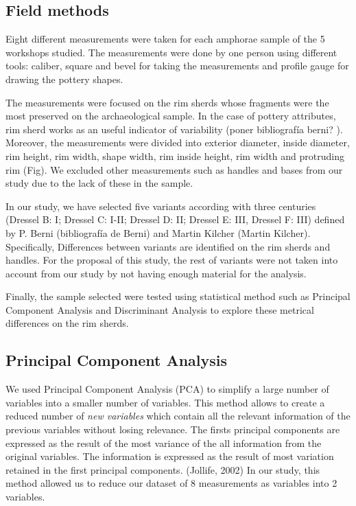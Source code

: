 \documentclass[review]{elsarticle}
\begin{document}


\subsection{Field methods}


Eight different measurements were taken for each amphorae sample of the 5 workshops studied. The measurements were done by one person using different tools: caliber, square and bevel for taking the measurements and profile gauge for drawing the pottery shapes. 

The measurements were focused on the rim sherds whose fragments were the most preserved on the archaeological sample. In the case of pottery attributes, rim sherd works as an useful indicator of variability (poner bibliografía berni? ). Moreover, the measurements were divided into exterior diameter, inside diameter, rim height, rim width, shape width, rim inside height, rim width and protruding rim (Fig). We excluded other measurements such as handles and bases from our study due to the lack of these in the sample.    

In our study, we have selected five variants according with three centuries (Dressel B: I; Dressel C: I-II; Dressel D: II; Dressel E: III, Dressel F: III) defined by P. Berni (bibliografía de Berni) and Martin Kilcher (Martin Kilcher). Specifically, Differences between variants are identified on the rim sherds and handles. For the proposal of this study, the rest of variants were not taken into account from our study by not having enough material for the analysis. 

Finally, the sample selected were tested using statistical method such as Principal Component Analysis and Discriminant Analysis to explore these metrical differences on the rim sherds. 
 

\subsection{Principal Component Analysis}


We used Principal Component Analysis (PCA) to simplify a large number of variables into a smaller number of variables. This method allows to create a reduced number of \textit{new variables} which contain all the relevant information of the previous variables without losing relevance. The firsts principal components are expressed as the result of the most variance of the all information from the original variables.  
The information is expressed as the result of most variation retained in the first principal components. (Jollife, 2002)
In our study, this method allowed us to reduce our dataset of 8 measurements as variables into 2 variables. 
\end{document}
